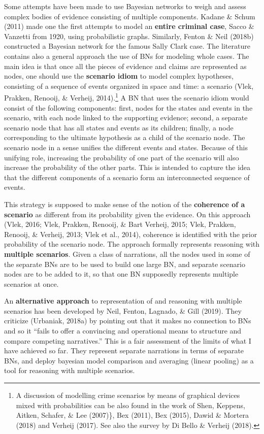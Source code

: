 \documentclass[11pt,dvipsnames,enabledeprecatedfontcommands]{scrartcl}
\begin{document}
Some attempts have been made to use Bayesian networks to weigh and
assess complex bodies of evidence consisting of multiple components.
Kadane \& Schum (2011) made one the first attempts to model an
\textbf{entire criminal case}, Sacco \& Vanzetti from 1920, using
probabilistic graphs. Similarly, Fenton \& Neil (2018b) constructed a
Bayesian network for the famous Sally Clark case. The literature
contains also a general approach the use of BNs for modeling whole
cases. The main idea is that once all the pieces of evidence and claims
are represented as nodes, one should use the \textbf{scenario idiom} to
model complex hypotheses, consisting of a sequence of events organized
in space and time: a scenario (Vlek, Prakken, Renooij, \& Verheij,
2014).\footnote{A discussion of modelling crime scenarios by means of
  graphical devices mixed with probabilities can be also found in the
  work of Shen, Keppens, Aitken, Schafer, \& Lee (2007)\}, Bex (2011),
  Bex (2015), Dawid \& Mortera (2018) and Verheij (2017). See also the
  survey by Di Bello \& Verheij (2018).} A BN that uses the scenario
idiom would consist of the following components: first, nodes for the
states and events in the scenario, with each node linked to the
supporting evidence; second, a separate scenario node that has all
states and events as its children; finally, a node corresponding to the
ultimate hypothesis as a child of the scenario node. The scenario node
in a sense unifies the different events and states. Because of this
unifying role, increasing the probability of one part of the scenario
will also increase the probability of the other parts. This is intended
to capture the idea that the different components of a scenario form an
interconnected sequence of events.

This strategy is supposed to make sense of the notion of the
\textbf{coherence of a scenario} as different from its probability given
the evidence. On this approach (Vlek, 2016; Vlek, Prakken, Renooij, \&
Bart Verheij, 2015; Vlek, Prakken, Renooij, \& Verheij, 2013; Vlek et
al., 2014), coherence is identified with the prior probability of the
scenario node. The approach formally represents reasoning with
\textbf{multiple scenarios}. Given a class of narrations, all the nodes
used in some of the separate BNs are to be used to build one large BN,
and separate scenario nodes are to be added to it, so that one BN
supposedly represents multiple scenarios at once.

An \textbf{alternative approach} to representation of and reasoning with
multiple scenarios has been developed by Neil, Fenton, Lagnado, \& Gill
(2019). They criticize (Urbaniak, 2018a) by pointing out that it makes
no connection to BNs and so it ``fails to offer a convincing and
operational means to structure and compare competing narratives.'' This
is a fair assessment of the limits of what I have achieved so far. They
represent separate narrations in terms of separate BNs, and deploy
bayesian model comparison and averaging (linear pooling) as a tool for
reasoning with multiple scenarios.
\end{document}

